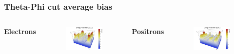 \documentclass{beamer}
\begin{document}
		\begin{frame}
			\frametitle{Theta-Phi cut average bias}
			\begin{columns}
				\centering
				\Large \textbf{Electrons}
				\begin{figure}
					\centering
					\includegraphics[width = 0.95 \linewidth]{images/c_e_theta_phi.png}
				\end{figure}
				\centering
				\Large \textbf{Positrons}
				\begin{figure}
					\centering
					\includegraphics[width = 0.95 \linewidth]{images/c_p_theta_phi.png}
				\end{figure}
			\end{columns}
		\end{frame}
\end{document}
